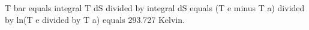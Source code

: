 T bar equals integral T dS divided by integral dS equals (T e minus T a) divided by ln(T e divided by T a) equals 293.727 Kelvin.